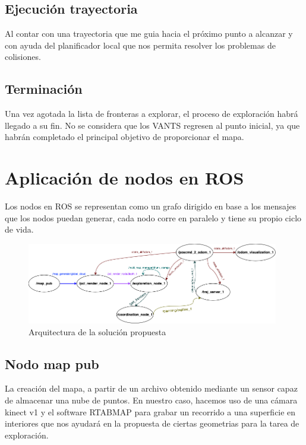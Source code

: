 \subsection*{Ejecución trayectoria}

Al contar con una trayectoria que me guia hacia el próximo punto a alcanzar y con ayuda del planificador local que nos permita resolver los problemas de colisiones.


\subsection*{Terminación}

Una vez agotada la lista de fronteras a explorar, el proceso de exploración habrá llegado a su fin.
No se considera que los VANTS regresen al punto inicial, ya que habrán completado el principal objetivo de proporcionar el mapa.

\section{Aplicación de nodos en ROS}

Los nodos en ROS se representan como un grafo dirigido en base a los mensajes que los nodos puedan generar, cada nodo corre en paralelo y tiene su propio ciclo de vida.

\begin{figure}[h]
\centering
\includegraphics[width=0.98\textwidth]{images/ros_nodes}
\caption{Arquitectura de la solución propuesta}
\end{figure}

\subsection*{Nodo map pub}
La creación del mapa, a partir de un archivo obtenido mediante un sensor capaz de almacenar una nube de puntos.
En nuestro caso, hacemos uso de una cámara kinect v1 y el software RTABMAP para grabar un recorrido a una superficie en interiores que nos ayudará en la propuesta de ciertas geometrias para la tarea de exploración.

